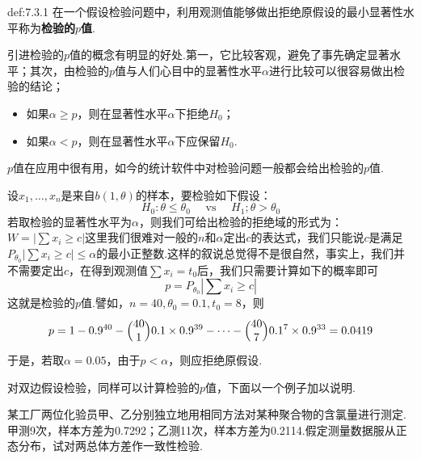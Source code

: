 \begin{definition}{}{def:7.3.1}
	在一个假设检验问题中，利用观测值能够做出拒绝原假设的最小显著性水平称为\textbf{检验的$p$值}.
\end{definition}
引进检验的$p$值的概念有明显的好处.第一，它比较客观，避免了事先确定显著水平；其次，由检验的$p$值与人们心目中的显著性水平$\alpha$进行比较可以很容易做出检验的结论；
\begin{itemize}
	\item 如果$\alpha\geq p$，则在显著性水平$\alpha$下拒绝$H_{0}$；
	\item 如果$\alpha<p$，则在显著性水平$\alpha$下应保留$H_{0}$.
\end{itemize}
$p$值在应用中很有用，如今的统计软件中对检验问题一般都会给出检验的$p$值.
\begin{example}\label{exam7.3.6}
	设$x_{1},\dotsc,x_{n}$是来自$b(1,\theta)$的样本，要检验如下假设：
	\[H _ { 0 } : \theta \leq \theta _ { 0 } \quad \text { vs } \quad H _ { 1 } ; \theta > \theta _ { 0 }\]
	若取检验的显著性水平为$\alpha$，则我们可给出检验的拒绝域的形式为：$W=\left|\sum{x_i\geq c}\right|$这里我们很难对一般的$n$和$\alpha$定出$c$的表达式，我们只能说$c$是满足$P_{\theta_0}\left|\sum{x_i\geq c}\right|\leq\alpha $的最小正整数.这样的叙说总觉得不是很自然，事实上，我们并不需要定出$c$，在得到观测值$\sum x _ { i } = t _ { 0 }$后，我们只需要计算如下的概率即可
	\[
	p=P_{\theta_0}\left|\sum{x_i\geq c}\right|
	\]
	这就是检验的$p$值.譬如，$n=40,\theta_{ 0 }=0.1,t_{0}=8$，则
	\[p = 1 - 0.9 ^ { 40 } - \Binom{40}1 0.1 \times 0.9 ^ { 39 } - \cdots - \Binom{40}7 0.1 ^ { 7 } \times 0.9 ^ { 33 } = 0.0419\]
	于是，若取$\alpha=0.05$，由于$p<\alpha$，则应拒绝原假设.
	\end{example}
对双边假设检验，同样可以计算检验的$p$值，下面以一个例子加以说明.
\begin{example}\label{exam7.3.7}
	某工厂两位化验员甲、乙分别独立地用相同方法对某种聚合物的含氯量进行测定.甲测9次，样本方差为0.7292；乙测11次，样本方差为0.2114.假定测量数据服从正态分布，试对两总体方差作一致性检验.
\end{example}

